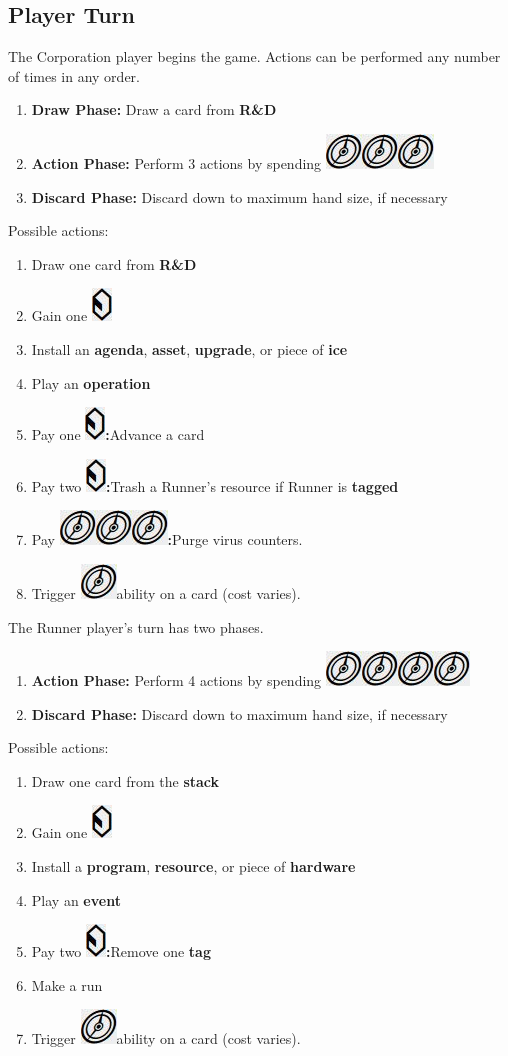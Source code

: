 \documentclass[12pt]{article}
\newenvironment{enumerateCustom}
{\begin{enumerate}
  \setlength{\itemsep}{1pt}
  \setlength{\parskip}{0pt}
  \setlength{\parsep}{0pt}}
{\end{enumerate}}
\newcommand{\credit}{\includegraphics[scale=0.40]{images/creditLarge.jpg}\hspace{0.3em}}
\newcommand{\creditWithColon}{\includegraphics[scale=0.40]{images/creditLarge.jpg}\textbf{:}\hspace{0.3em}}
\newcommand{\action}{\includegraphics[scale=0.40]{images/actionLarge.jpg}\hspace{0.3em}}
\newcommand{\actionWithColon}{\includegraphics[scale=0.40]{images/actionLarge.jpg}\textbf{:}\hspace{0.3em}}
\begin{document}
\begin{multicols*}{2}
\section*{Player Turn}
The Corporation player begins the game. Actions can be performed any number of times in any order.
\begin{enumerateCustom}
	\item \textbf{Draw Phase:} Draw a card from \textbf{R\&D}
	\item \textbf{Action Phase:} Perform 3 actions by spending \action \action \action
	\item \textbf{Discard Phase:} Discard down to maximum hand size, if necessary
\end{enumerateCustom}
Possible actions:
\begin{enumerateCustom}
	\item Draw one card from \textbf{R\&D}
	\item Gain one \credit
	\item Install an \textbf{agenda}, \textbf{asset}, \textbf{upgrade}, or piece of \textbf{ice}
	\item Play an \textbf{operation}
	\item Pay one \creditWithColon Advance a card
	\item Pay two \creditWithColon Trash a Runner's resource if Runner is \textbf{tagged}
	\item Pay \action \action \actionWithColon Purge virus counters.
	\item Trigger \action ability on a card (cost varies).
\end{enumerateCustom}

The Runner player's turn has two phases.
\begin{enumerateCustom}
	\item \textbf{Action Phase:} Perform 4 actions by spending \action \action \action \action
	\item \textbf{Discard Phase:} Discard down to maximum hand size, if necessary
\end{enumerateCustom}
Possible actions:
\begin{enumerateCustom}
	\item Draw one card from the \textbf{stack}
	\item Gain one \credit
	\item Install a \textbf{program}, \textbf{resource}, or piece of \textbf{hardware}
	\item Play an \textbf{event}
	\item Pay two \creditWithColon Remove one \textbf{tag}
	\item Make a run
	\item Trigger \action ability on a card (cost varies).
\end{enumerateCustom}


\end{multicols*}
\end{document}
